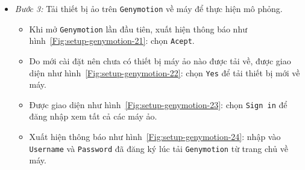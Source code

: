 \documentclass[13pt,a4paper]{extreport}
\begin{document}
\begin{itemize}
			\item \textit{Bước 3:} Tải thiết bị ảo trên \verb|Genymotion| về máy để thực hiện mô phỏng.
				\begin{itemize}
					\item Khi mở \verb|Genymotion| lần đầu tiên, xuất hiện thông báo như hình~\ref{Fig:setup-genymotion-21}: chọn \verb|Acept|.
					
					\item Do mới cài đặt nên chưa có thiết bị máy ảo nào được tải về, được giao diện như hình~\ref{Fig:setup-genymotion-22}: chọn \verb|Yes| để tải thiết bị mới về máy.
					
					\item Được giao diện như hình~\ref{Fig:setup-genymotion-23}: chọn \verb|Sign in| để đăng nhập xem tất cả các máy ảo.
					
					\item Xuất hiện thông báo như hình~\ref{Fig:setup-genymotion-24}: nhập vào \verb|Username| và \verb|Password| đã đăng ký lúc tải \verb|Genymotion| từ trang chủ về máy.
					

\end{itemize}
\end{itemize}
\end{document}
